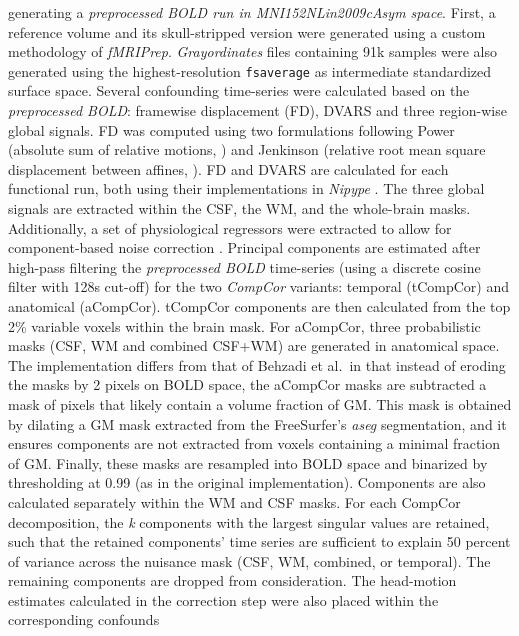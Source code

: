 \documentclass[]{article}
\begin{document}
\begin{description}
generating a \emph{preprocessed BOLD run in MNI152NLin2009cAsym space}.
First, a reference volume and its skull-stripped version were generated
using a custom methodology of \emph{fMRIPrep}. \emph{Grayordinates}
files \citep{hcppipelines} containing 91k samples were also generated
using the highest-resolution \texttt{fsaverage} as intermediate
standardized surface space. Several confounding time-series were
calculated based on the \emph{preprocessed BOLD}: framewise displacement
(FD), DVARS and three region-wise global signals. FD was computed using
two formulations following Power (absolute sum of relative motions,
\citet{power_fd_dvars}) and Jenkinson (relative root mean square
displacement between affines, \citet{mcflirt}). FD and DVARS are
calculated for each functional run, both using their implementations in
\emph{Nipype} \citep[following the definitions by][]{power_fd_dvars}.
The three global signals are extracted within the CSF, the WM, and the
whole-brain masks. Additionally, a set of physiological regressors were
extracted to allow for component-based noise correction
\citep[\emph{CompCor},][]{compcor}. Principal components are estimated
after high-pass filtering the \emph{preprocessed BOLD} time-series
(using a discrete cosine filter with 128s cut-off) for the two
\emph{CompCor} variants: temporal (tCompCor) and anatomical (aCompCor).
tCompCor components are then calculated from the top 2\% variable voxels
within the brain mask. For aCompCor, three probabilistic masks (CSF, WM
and combined CSF+WM) are generated in anatomical space. The
implementation differs from that of Behzadi et al.~in that instead of
eroding the masks by 2 pixels on BOLD space, the aCompCor masks are
subtracted a mask of pixels that likely contain a volume fraction of GM.
This mask is obtained by dilating a GM mask extracted from the
FreeSurfer's \emph{aseg} segmentation, and it ensures components are not
extracted from voxels containing a minimal fraction of GM. Finally,
these masks are resampled into BOLD space and binarized by thresholding
at 0.99 (as in the original implementation). Components are also
calculated separately within the WM and CSF masks. For each CompCor
decomposition, the \emph{k} components with the largest singular values
are retained, such that the retained components' time series are
sufficient to explain 50 percent of variance across the nuisance mask
(CSF, WM, combined, or temporal). The remaining components are dropped
from consideration. The head-motion estimates calculated in the
correction step were also placed within the corresponding confounds

\end{description}
\end{document}
